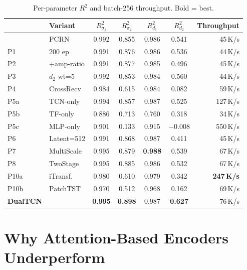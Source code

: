 \documentclass[journal]{IEEEtran}
\begin{document}
\begin{table}[t]
  \centering
  \footnotesize
  \caption{Per-parameter $R^2$ and batch-256 throughput.
  Bold = best.}
  \label{tab:supp_r2}
  \begin{tabular}{llccccr}
    \toprule
    & Variant & $R^2_{\sigma_1}$ & $R^2_{\sigma_2}$ & $R^2_{d_1}$
              & $R^2_{d_2}$ & Throughput \\
    \midrule
    & PCRN        & 0.992 & 0.855 & 0.986 & 0.541 &  45\,K/s \\
    P1  & 200 ep      & 0.991 & 0.876 & 0.986 & 0.536
        &  44\,K/s \\
    P2  & +amp-ratio  & 0.991 & 0.877 & 0.985 & 0.496
        &  45\,K/s \\
    P3  & $d_2$ wt=5  & 0.992 & 0.853 & 0.984 & 0.560
        &  44\,K/s \\
    P4  & CrossRecv   & 0.984 & 0.615 & 0.984 & 0.082
        &  59\,K/s \\
    P5a & TCN-only    & 0.994 & 0.857 & 0.987 & 0.525
        & 127\,K/s \\
    P5b & TF-only     & 0.886 & 0.713 & 0.760 & 0.318
        &  34\,K/s \\
    P5c & MLP-only    & 0.901 & 0.133 & 0.915 & $-$0.008
        & 550\,K/s \\
    P6  & Latent=512  & 0.991 & 0.868 & 0.987 & 0.411
        &  45\,K/s \\
    P7  & MultiScale  & 0.995 & 0.879 & \textbf{0.988} & 0.539
        &  67\,K/s \\
    P8  & TwoStage    & 0.995 & 0.885 & 0.986 & 0.532
        &  67\,K/s \\
    P10a & iTransf.   & 0.980 & 0.610 & 0.979 & 0.342
        & \textbf{247\,K/s} \\
    P10b & PatchTST   & 0.970 & 0.512 & 0.968 & 0.162
        & 69\,K/s \\
    \textbf{DualTCN}
        &             & \textbf{0.995} & \textbf{0.898} & 0.987
        & \textbf{0.627} & 76\,K/s \\
    \bottomrule
  \end{tabular}
\end{table}


\section{Why Attention-Based Encoders Underperform}
\label{sec:supp_transformer}
\end{document}

